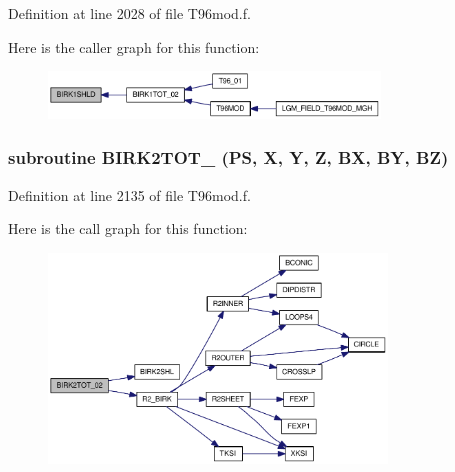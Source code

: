 Definition at line 2028 of file T96mod.f.

Here is the caller graph for this function:\nopagebreak
\begin{figure}[H]
\begin{center}
\leavevmode
\includegraphics[width=250pt]{_t96mod_8f_e7df392ea162336df5811079016b08ac_icgraph}
\end{center}
\end{figure}
\hypertarget{_t96mod_8f_72d9123c4c7f8cc57e525a533b45d5fe}{
\subsubsection[{BIRK2TOT\_\-02}]{\setlength{\rightskip}{0pt plus 5cm}subroutine BIRK2TOT\_ (PS, \/  X, \/  Y, \/  Z, \/  BX, \/  BY, \/  BZ)}}
\label{_t96mod_8f_72d9123c4c7f8cc57e525a533b45d5fe}




Definition at line 2135 of file T96mod.f.

Here is the call graph for this function:\nopagebreak
\begin{figure}[H]
\begin{center}
\leavevmode
\includegraphics[width=255pt]{_t96mod_8f_72d9123c4c7f8cc57e525a533b45d5fe_cgraph}
\end{center}
\end{figure}


